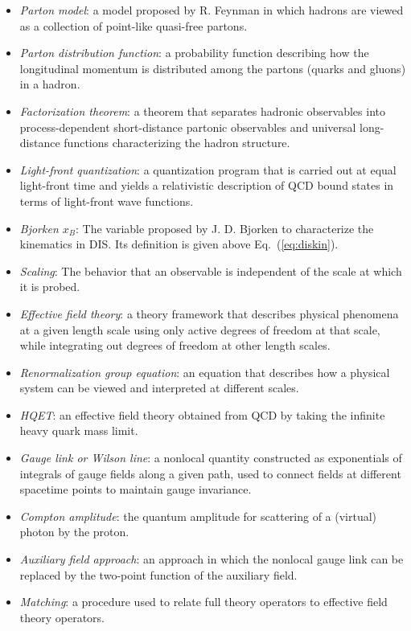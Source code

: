 \documentclass[aps,rmp,reprint,amsmath,amssymb,graphicx,longbibliography]{revtex4-1} %
\DeclareRobustCommand{\eq}[1]{Eq.~(\ref{eq:#1})}
\begin{document}
\begin{itemize}
	\setlength\itemsep{0em}
\item[] {\it \noindent Parton model}: a model proposed by R. Feynman in which hadrons are viewed as a collection of point-like quasi-free partons.
\item[] {\it Parton distribution function}: a probability function describing how the longitudinal momentum is distributed among the partons (quarks and gluons) in a hadron.
\item[] {\it Factorization theorem}: a theorem that separates hadronic observables into process-dependent short-distance partonic observables and universal long-distance functions characterizing the hadron structure.
\item[] {\it Light-front quantization}: a quantization program that is carried out at equal light-front time and yields a relativistic description of QCD bound states in terms of light-front wave functions.
\item[] {\it Bjorken $x_B$}: The variable proposed by J. D. Bjorken to characterize the kinematics in DIS. Its definition is given above \eq{diskin}.
\item[] {\it Scaling}: The behavior that an observable is independent of the scale at which it is probed.
\item[] {\it Effective field theory}: a theory framework that describes physical phenomena at a given length scale using only active degrees of freedom at that scale, while integrating out degrees of freedom at other length scales.
\item[] {\it Renormalization group equation}: an equation that describes how a physical system can be viewed and interpreted at different scales.
\item[] {\it HQET}: an effective field theory obtained from QCD by taking the infinite heavy quark mass limit.
\item[] {\it Gauge link or Wilson line}: a nonlocal quantity constructed as exponentials of integrals of gauge fields along a given path, used to connect fields at different spacetime points to maintain gauge invariance.
\item[] {\it Compton amplitude}: the quantum amplitude for scattering of a (virtual) photon by the proton.
\item[] {\it Auxiliary field approach}: an approach in which the nonlocal gauge link can be replaced by the two-point function of the auxiliary field.
\item[] {\it Matching}: a procedure used to relate full theory operators to effective field theory operators.

\end{itemize}
\end{document}
